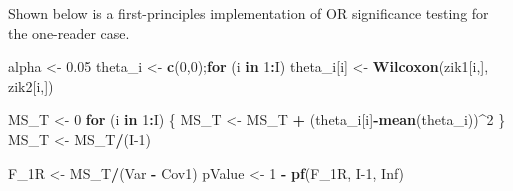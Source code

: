 \documentclass[
]{book}
\newenvironment{Shaded}{\begin{snugshade}}{\end{snugshade}}
\newcommand{\ControlFlowTok}[1]{\textcolor[rgb]{0.13,0.29,0.53}{\textbf{#1}}}
\newcommand{\DecValTok}[1]{\textcolor[rgb]{0.00,0.00,0.81}{#1}}
\newcommand{\FloatTok}[1]{\textcolor[rgb]{0.00,0.00,0.81}{#1}}
\newcommand{\KeywordTok}[1]{\textcolor[rgb]{0.13,0.29,0.53}{\textbf{#1}}}
\newcommand{\NormalTok}[1]{#1}
\newcommand{\OperatorTok}[1]{\textcolor[rgb]{0.81,0.36,0.00}{\textbf{#1}}}
\newcommand{\OtherTok}[1]{\textcolor[rgb]{0.56,0.35,0.01}{#1}}
\newcommand{\StringTok}[1]{\textcolor[rgb]{0.31,0.60,0.02}{#1}}
\begin{document}
Shown below is a first-principles implementation of OR significance testing for the one-reader case.

\begin{Shaded}
\begin{Highlighting}[]
\NormalTok{alpha \textless{}{-}}\StringTok{ }\FloatTok{0.05}
\NormalTok{theta\_i \textless{}{-}}\StringTok{ }\KeywordTok{c}\NormalTok{(}\DecValTok{0}\NormalTok{,}\DecValTok{0}\NormalTok{);}\ControlFlowTok{for}\NormalTok{ (i }\ControlFlowTok{in} \DecValTok{1}\OperatorTok{:}\NormalTok{I) theta\_i[i] \textless{}{-}}\StringTok{ }\KeywordTok{Wilcoxon}\NormalTok{(zik1[i,], zik2[i,])}

\NormalTok{MS\_T \textless{}{-}}\StringTok{ }\DecValTok{0}
\ControlFlowTok{for}\NormalTok{ (i }\ControlFlowTok{in} \DecValTok{1}\OperatorTok{:}\NormalTok{I) \{}
\NormalTok{  MS\_T \textless{}{-}}\StringTok{ }\NormalTok{MS\_T }\OperatorTok{+}\StringTok{ }\NormalTok{(theta\_i[i]}\OperatorTok{{-}}\KeywordTok{mean}\NormalTok{(theta\_i))}\OperatorTok{\^{}}\DecValTok{2}
\NormalTok{\}}
\NormalTok{MS\_T \textless{}{-}}\StringTok{ }\NormalTok{MS\_T}\OperatorTok{/}\NormalTok{(I}\DecValTok{{-}1}\NormalTok{)}

\NormalTok{F\_1R \textless{}{-}}\StringTok{ }\NormalTok{MS\_T}\OperatorTok{/}\NormalTok{(Var }\OperatorTok{{-}}\StringTok{ }\NormalTok{Cov1)}
\NormalTok{pValue \textless{}{-}}\StringTok{ }\DecValTok{1} \OperatorTok{{-}}\StringTok{ }\KeywordTok{pf}\NormalTok{(F\_1R, I}\DecValTok{{-}1}\NormalTok{, }\OtherTok{Inf}\NormalTok{)}


\end{Highlighting}
\end{Shaded}
\end{document}
